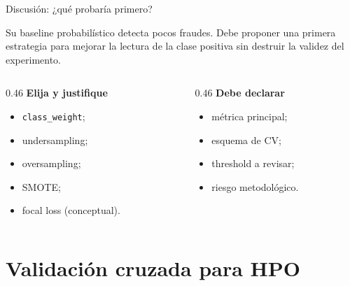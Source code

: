 \documentclass[aspectratio=169,12pt]{beamer}
\newcommand{\colhead}[1]{\textbf{#1}\par\vspace{2pt}}
\begin{document}
\begin{frame}{Discusión: ¿qué probaría primero?}
  \begin{taskbox}
    \large Su baseline probabilístico detecta pocos fraudes. Debe proponer una primera estrategia para mejorar la lectura de la clase positiva sin destruir la validez del experimento.
  \end{taskbox}
  \vspace{2pt}
  \small
  \begin{columns}[T]
    \begin{column}{0.46\textwidth}
      \colhead{Elija y justifique}
      \begin{itemize}
        \item \texttt{class\_weight};
        \item undersampling;
        \item oversampling;
        \item SMOTE;
        \item focal loss (conceptual).
      \end{itemize}
    \end{column}
    \begin{column}{0.46\textwidth}
      \colhead{Debe declarar}
      \begin{itemize}
        \item métrica principal;
        \item esquema de CV;
        \item threshold a revisar;
        \item riesgo metodológico.
      \end{itemize}
    \end{column}
  \end{columns}
\end{frame}

\section{Validación cruzada para HPO}
\end{document}
